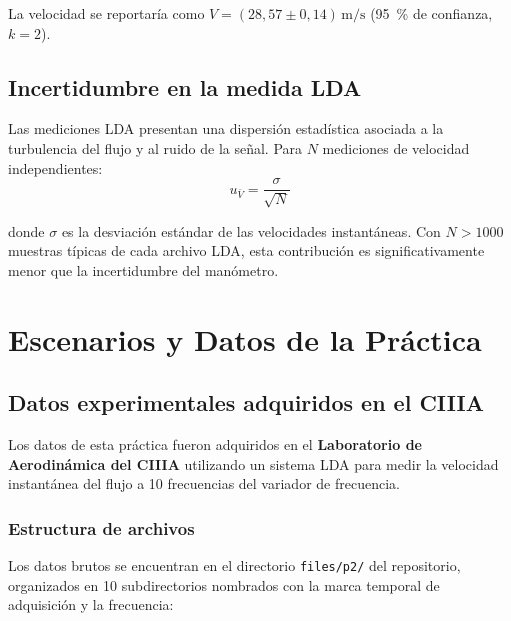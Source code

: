 \documentclass[12pt,a4paper]{article}
\begin{document}
La velocidad se reportaría como $V = (28{,}57 \pm 0{,}14)\,\si{\metre\per\second}$
(\SI{95}{\percent} de confianza, $k=2$).

\subsection{Incertidumbre en la medida LDA}

Las mediciones LDA presentan una dispersión estadística asociada a la
turbulencia del flujo y al ruido de la señal.  Para $N$ mediciones de velocidad
independientes:
\begin{equation}
	u_{\bar{V}} = \frac{\sigma}{\sqrt{N}}
	\label{eq:uV_lda}
\end{equation}

donde $\sigma$ es la desviación estándar de las velocidades instantáneas.  Con
$N > 1000$ muestras típicas de cada archivo LDA, esta contribución es
significativamente menor que la incertidumbre del manómetro.

\section{Escenarios y Datos de la Práctica}
\label{sec:escenarios}

\subsection{Datos experimentales adquiridos en el CIIIA}

Los datos de esta práctica fueron adquiridos en el \textbf{Laboratorio de
	Aerodinámica del CIIIA} utilizando un sistema LDA para medir la velocidad
instantánea del flujo a 10 frecuencias del variador de frecuencia.

\subsubsection{Estructura de archivos}

Los datos brutos se encuentran en el directorio
\texttt{files/p2/} del repositorio, organizados en 10 subdirectorios
nombrados con la marca temporal de adquisición y la frecuencia:
\end{document}
